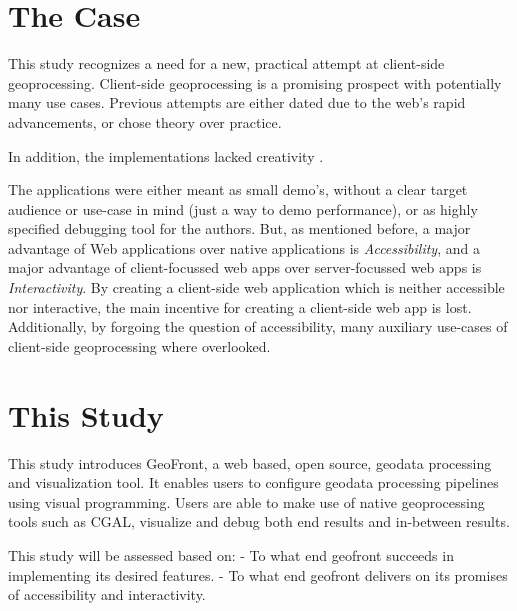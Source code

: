 \section{ The Case }


This study recognizes a need for a new, practical attempt at client-side geoprocessing. 
Client-side geoprocessing is a promising prospect with potentially many use cases.
Previous attempts are either dated due to the web's rapid advancements, or chose theory over practice.

In addition, the implementations lacked creativity . 

The applications were either meant as small demo's, without a clear target audience or use-case in mind (just a way to demo performance), or as highly specified debugging tool for the authors.   
But, as mentioned before, a major advantage of Web applications over native applications is \emph{Accessibility}, and a major advantage of client-focussed web apps over server-focussed web apps is \emph{Interactivity}. 
By creating a client-side web application which is neither accessible nor interactive, the main incentive for creating a client-side web app is lost.
Additionally, by forgoing the question of accessibility, many auxiliary use-cases of client-side geoprocessing where overlooked.

\section{This Study}

This study introduces GeoFront, a web based, open source, geodata processing and visualization tool. 
It enables users to configure geodata processing pipelines using visual programming. 
Users are able to make use of native geoprocessing tools such as CGAL, visualize and debug both end results and in-between results.

This study will be assessed based on: 
- To what end geofront succeeds in implementing its desired features.
- To what end geofront delivers on its promises of accessibility and interactivity.

